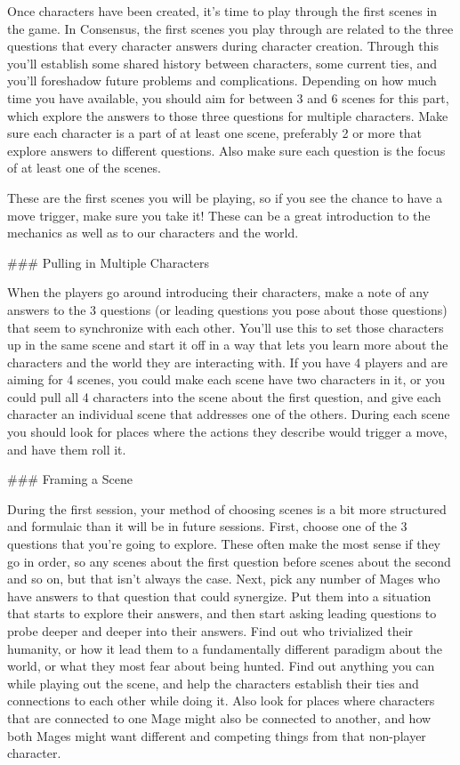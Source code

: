 \documentclass[
  oneside,
  statementpaper,
  9pt]{memoir}
\begin{document}
\begin{MC}

Once characters have been created, it’s time to play through the first scenes in the game. In Consensus, the first scenes you play through are related to the three questions that every character answers during character creation. Through this you’ll establish some shared history between characters, some current ties, and you’ll foreshadow future problems and complications. Depending on how much time you have available, you should aim for between 3 and 6 scenes for this part, which explore the answers to those three questions for multiple characters. Make sure each character is a part of at least one scene, preferably 2 or more that explore answers to different questions. Also make sure each question is the focus of at least one of the scenes.

These are the first scenes you will be playing, so if you see the chance to have a move trigger, make sure you take it! These can be a great introduction to the mechanics as well as to our characters and the world.

### Pulling in Multiple Characters

When the players go around introducing their characters, make a note of any answers to the 3 questions (or leading questions you pose about those questions) that seem to synchronize with each other. You’ll use this to set those characters up in the same scene and start it off in a way that lets you learn more about the characters and the world they are interacting with. If you have 4 players and are aiming for 4 scenes, you could make each scene have two characters in it, or you could pull all 4 characters into the scene about the first question, and give each character an individual scene that addresses one of the others. During each scene you should look for places where the actions they describe would trigger a move, and have them roll it.

### Framing a Scene

During the first session, your method of choosing scenes is a bit more structured and formulaic than it will be in future sessions. First, choose one of the 3 questions that you’re going to explore. These often make the most sense if they go in order, so any scenes about the first question before scenes about the second and so on, but that isn’t always the case. Next, pick any number of Mages who have answers to that question that could synergize. Put them into a situation that starts to explore their answers, and then start asking leading questions to probe deeper and deeper into their answers. Find out who trivialized their humanity, or how it lead them to a fundamentally different paradigm about the world, or what they most fear about being hunted. Find out anything you can while playing out the scene, and help the characters establish their ties and connections to each other while doing it. Also look for places where characters that are connected to one Mage might also be connected to another, and how both Mages might want different and competing things from that non-player character.


\end{MC}
\end{document}

